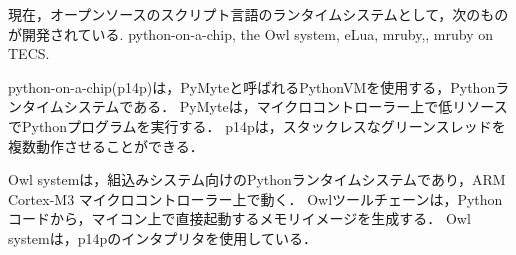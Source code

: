 \documentclass[submit,techrep]{ipsj}
\begin{document}
現在，オープンソースのスクリプト言語のランタイムシステムとして，次のものが開発されている.
python-on-a-chip\cite{url:python-on-a-chip}, the Owl system\cite{par:owl}, eLua\cite{url:eLua}, mruby\cite{par:mruby},\cite{url:mruby}, mruby on TECS\cite{par:mrubyonTECS}.

python-on-a-chip(p14p)は，PyMyteと呼ばれるPythonVMを使用する，Pythonランタイムシステムである．
PyMyteは，マイクロコントローラー上で低リソースでPythonプログラムを実行する．
p14pは，スタックレスなグリーンスレッドを複数動作させることができる．

Owl systemは，組込みシステム向けのPythonランタイムシステムであり，ARM Cortex-M3 マイクロコントローラー上で動く．
Owlツールチェーンは，Pythonコードから，マイコン上で直接起動するメモリイメージを生成する．
Owl systemは，p14pのインタプリタを使用している．
\end{document}

